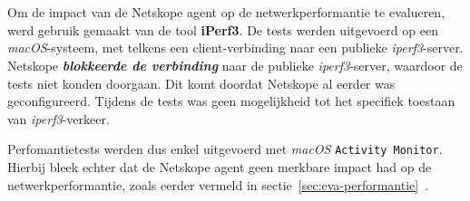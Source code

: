 \section{}
\label{sec:performantie-resultaten}

Om de impact van de Netskope agent op de netwerkperformantie te evalueren, werd gebruik gemaakt van de tool \textbf{iPerf3}.
De tests werden uitgevoerd op een \textit{macOS}-systeem, met telkens een client-verbinding naar een publieke \textit{iperf3}-server.
Netskope \textbf{\textit{blokkeerde de verbinding}} naar de publieke \textit{iperf3}-server, waardoor de tests niet konden doorgaan.
Dit komt doordat Netskope al eerder was geconfigureerd. Tijdens de tests was geen mogelijkheid tot het specifiek toestaan van \textit{iperf3}-verkeer.

Perfomantietests werden dus enkel uitgevoerd met \textit{macOS} \texttt{Activity Monitor}.
Hierbij bleek echter dat de Netskope agent geen merkbare impact had op de netwerkperformantie, zoals eerder vermeld in sectie~\ref{sec:eva-performantie}~\autocite{Netskope2025Utilization}.






